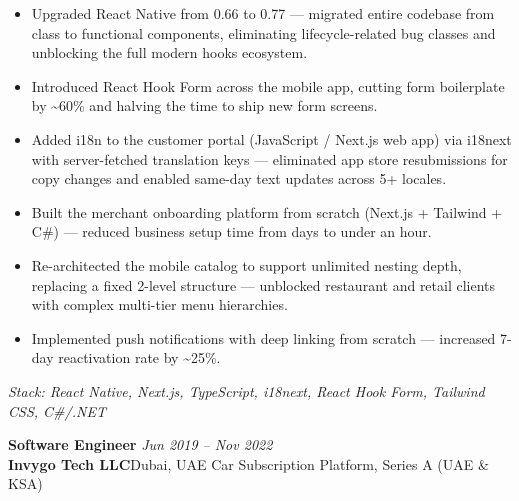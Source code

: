\documentclass[11pt, letterpaper]{article}
\newcommand{\job}[4]{%
  \textbf{#1} \hfill \textit{#3}\\
  \textbf{#2}\quad\textbar\quad #4
}
\begin{document}
\begin{itemize}
  \item Upgraded React Native from 0.66 to 0.77 — migrated entire codebase from class to functional components, eliminating lifecycle-related bug classes and unblocking the full modern hooks ecosystem.
  \item Introduced React Hook Form across the mobile app, cutting form boilerplate by \textasciitilde60\% and halving the time to ship new form screens.
  \item Added i18n to the customer portal (JavaScript / Next.js web app) via i18next with server-fetched translation keys — eliminated app store resubmissions for copy changes and enabled same-day text updates across 5+ locales.
  \item Built the merchant onboarding platform from scratch (Next.js + Tailwind + C\#) — reduced business setup time from days to under an hour.
  \item Re-architected the mobile catalog to support unlimited nesting depth, replacing a fixed 2-level structure — unblocked restaurant and retail clients with complex multi-tier menu hierarchies.
  \item Implemented push notifications with deep linking from scratch — increased 7-day reactivation rate by \textasciitilde25\%.
\end{itemize}
\textit{Stack: React Native, Next.js, TypeScript, i18next, React Hook Form, Tailwind CSS, C\#/.NET}

\vspace{6pt}

\job{Software Engineer}{Invygo Tech LLC}{Jun 2019 – Nov 2022}{Dubai, UAE \textbar{} Car Subscription Platform, Series A (UAE \& KSA)}
\end{document}
